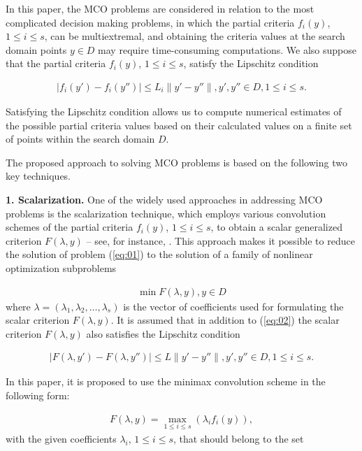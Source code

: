 \documentclass[smallcondensed]{svjour3}     %
\begin{document}
In this paper, the MCO problems are considered in relation to the most complicated decision making problems, in which the partial criteria $f_i (y)$, $1 \leq i \leq s$, can be multiextremal, and obtaining the criteria values at the search domain points $y \in D$  may require time-consuming computations. We also suppose that the partial criteria $f_i (y)$, $1 \leq i \leq s$, satisfy the Lipschitz condition

\begin{eqnarray} \label{eq:02}
|f_i(y') - f_i(y'')| \leq L_i \|y' - y''\|, y', y'' \in D, 1 \leq i \leq s. 
\end{eqnarray}

Satisfying the Lipschitz condition allows us to compute numerical estimates of the possible partial criteria values based on their calculated values on a finite set of points within the search domain $D$. \par

The proposed approach to solving MCO problems is based on the following two key techniques. \par

	{\bf 1. Scalarization.} One of the widely used approaches in addressing MCO problems is the scalarization technique, which employs various convolution schemes of the partial criteria $f_i (y)$, $1 \leq i \leq s$, to obtain a scalar generalized criterion $F(\lambda,y)$ -- see, for instance, \cite{c8,c9}. This approach makes it possible to reduce the solution of problem (\ref{eq:01}) to the solution of a family of nonlinear optimization subproblems

\begin{eqnarray} \label{eq:03}
\min F(\lambda,y), y \in D 
\end{eqnarray}
where $\lambda = (\lambda_1  ,\lambda_2,\dots,\lambda_s)$ is the vector of coefficients used for formulating the scalar criterion $F(\lambda,y)$. It is assumed that in addition to (\ref{eq:02}) the scalar criterion $F(\lambda,y)$ also satisfies the Lipschitz condition

\begin{eqnarray} \label{eq:04}
|F(\lambda, y') - F(\lambda, y'')| \leq L \|y' - y''\|, y', y'' \in D, 1 \leq i \leq s. 
\end{eqnarray}

In this paper, it is proposed to use the minimax convolution scheme in the following form:

\begin{eqnarray} \label{eq:05}
F(\lambda,y) = \max_{1 \leq i \leq s}(\lambda_i f_i(y)), 
\end{eqnarray}
with the given coefficients $\lambda_i$, $1 \leq i \leq s$, that should belong to the set
\end{document}
